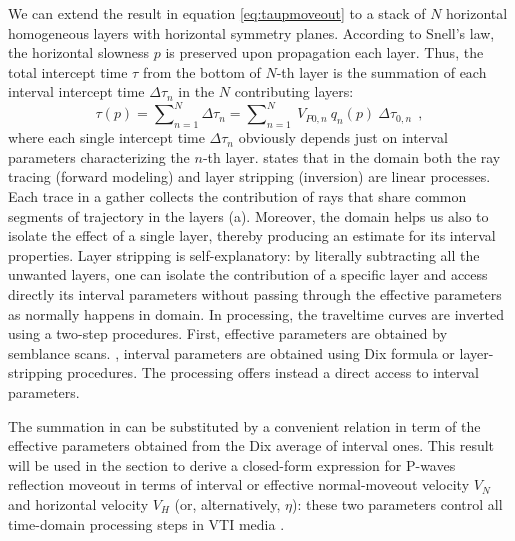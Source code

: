 We can extend the result in equation \ref{eq:taupmoveout} to a stack
of $N$ horizontal homogeneous layers with horizontal symmetry
planes. According to Snell's law, the horizontal slowness $p$ is
preserved upon propagation   each layer. Thus, the total
intercept time $\tau $ from the bottom of $N$-th layer is the summation
of each interval intercept time $\Delta \tau _{n}$ in the $N$
contributing layers:
\begin{equation}
\tau (p)=\sum\nolimits_{n=1}^{N} \Delta \tau_{n} =  \sum\nolimits_{n=1}^{N}~V_{P0,n}~q_{n}(p)~\Delta \tau _{0,n}~~,
\label{eqn:taup_layers}
\end{equation}
where each single intercept time $\Delta \tau _{n}$ obviously depends
just on interval parameters characterizing the $n$-th layer.
 states that in the \taup domain both the ray tracing
(forward modeling) and layer stripping (inversion) are linear
processes.  Each trace in a \taup gather collects the contribution of
rays that share common segments of trajectory in the layers
(a).  Moreover, the \taup domain helps us also to
 isolate the effect of a single layer, thereby producing
an estimate for its interval properties. Layer stripping is
self-explanatory: by literally subtracting all the unwanted layers,
one can isolate the contribution of a specific layer and access
directly its interval parameters without passing through the effective
parameters as normally happens in \tx domain. In \tx processing, the
traveltime curves are inverted using a two-step procedures. First,
effective parameters are obtained by semblance scans. 
, interval parameters are obtained using  Dix
formula or layer-stripping procedures. The \taup processing offers
instead a direct access to interval parameters.

The summation in  can be substituted by a convenient
relation in term of the effective parameters obtained from the Dix
average of interval ones. This result will be used in the
  section to derive a closed-form expression
for P-waves \taup reflection moveout in terms of interval or effective
normal-moveout velocity $V_N$ and horizontal velocity $V_H$ (or,
alternatively, $\eta$): these two parameters control all time-domain
processing steps in VTI media \citep{alkhalifah:1550}.

